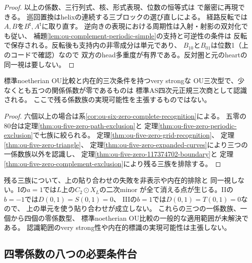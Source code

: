 \begin{proof}
以上の係数、三行列式、核、形式表現、位数の恒等式は
で厳密に再現できる。
巡回置換はhelixの連続する三ブロックの選び直しによる。
経路反転では$A,B$を$B^{\mathsf t},A^{\mathsf t}$に取り直す。
逆向きの表現における周期性は入射・射影の双対化でも従い、
補題\ref{lem:ou-complement-periodic-simple}の支持と可逆性の条件は
反転で保存される。反転後も支持内の非零成分は単元であり、
$B_{10}$と$B_{01}$は位数1（上のコードで確認）なので
双方のhead多重度が有界である。反対圏と元のheartの同一視は要しない。
\end{proof}

\begin{corollary}
\label{cor:ou-five-zero-complete-recognition}
標準noetherian OU比較と内在的三次条件を持つvery strongな
OU三次型で、少なくとも五つの関係係数が零であるものは
標準AS四次元正規三次商として認識される。
ここで残る係数族の実現可能性を主張するものではない。
\end{corollary}
\begin{proof}
六個以上の場合は系\ref{cor:ou-six-zero-complete-recognition}による。
五零の80台は定理\ref{thm:ou-five-zero-path-exclusion}と
定理\ref{thm:ou-five-zero-periodic-exclusion}で七族に絞られる。
定理\ref{thm:ou-five-zero-grid-recognition}、
定理\ref{thm:ou-five-zero-triangle}、
定理\ref{thm:ou-five-zero-expanded-curves}により三つの一係数族以外を認識し、
定理\ref{thm:ou-five-zero-117374702-boundary}と
定理\ref{thm:ou-five-zero-complement-exclusion}により残る三族を排除する。
\end{proof}

\begin{remark}
残る三族について、上の貼り合わせの失敗を非表示や内在的排除と
同一視しない。Iの$a=1$では$L$上の$C_2\odot X_L$の二次minor
が全て消える点が生じる。IIの$b=-1$では$D(0,1)=S(0,1)=0$、
IIIの$b=1$では$D(0,1)=T(0,1)=0$なので、
上の単元を使う貼り合わせが成立しない。
これらの三つの一係数族、一個から四個の零係数型、
標準noetherian OU比較の一般的な適用範囲が未解決である。
認識範囲のvery strong性や内在的標識の実現可能性は主張しない。
\end{remark}


\subsection{四零係数の八つの必要条件台}
\label{subsec:ou-four-zero-supports}

